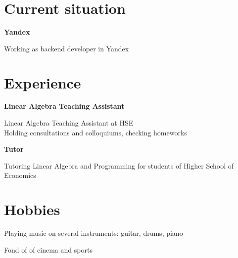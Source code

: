 \documentclass[a4paper,10pt]{article}
\begin{document}
\begin{adjustbox}{valign=t}
\begin{minipage}{0.6\textwidth} %
\section*{Current situation}
\begin{description}
\raggedright
\item[\normalfont \textcolor{ColorOne}{Nov. 2021 -- Nowadays}] \textbf{Yandex}\\ \medskip

Working as backend developer in Yandex\\


\end{description}

\section*{Experience}
\begin{description}
\raggedright
\item[\normalfont \textcolor{ColorOne}{Sep. 2021 -- Nowadays}] 
	\textbf{Linear Algebra Teaching Assistant}\\ \medskip
	
	Linear Algebra Teaching Assistant at HSE\\
	
	Holding consultations and colloquiums, checking homeworks
	
\item[\normalfont \textcolor{ColorOne}{Sep. 2021 -- Nowadays}] 
	\textbf{Tutor}\\ \medskip
	
    Tutoring Linear Algebra and Programming for students of Higher School of Economics 
\end{description}

\section*{Hobbies}
\begin{description}
	\raggedright
	\item Playing music on several instruments: guitar, drums, piano
	\item Fond of of cinema and sports
\end{description}

\MySkip
\begin{multicols}{2}

\end{multicols}
\end{minipage}
\end{adjustbox}
\end{document}
